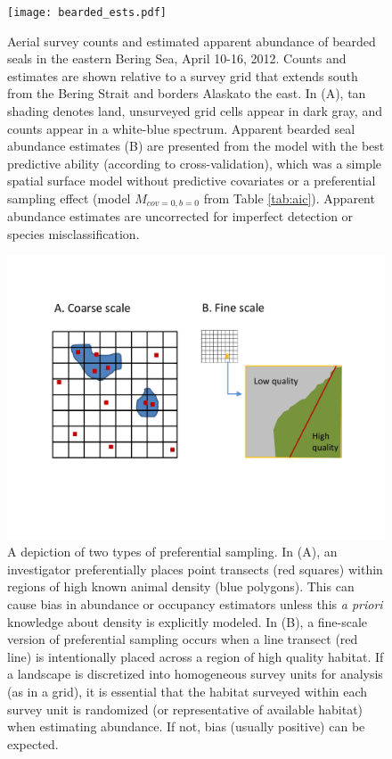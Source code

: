 \documentclass[times,mee,doublespace,]{besauth2}
\begin{document}
\begin{figure} %
\begin{center}
\texttt{[image: bearded\_ests.pdf]}
\caption{Aerial survey counts and estimated apparent abundance of bearded seals in the eastern Bering Sea, April 10-16, 2012. Counts and estimates are shown relative to a survey grid that extends south from the Bering Strait and borders Alaskato the east. In (A), tan shading denotes land, unsurveyed grid cells appear in dark gray, and counts appear in a white-blue spectrum.  Apparent bearded seal abundance estimates (B) are presented from the model with the best predictive ability (according to cross-validation), which was a simple spatial surface model without predictive covariates or a preferential sampling effect (model $M_{cov=0,b=0}$ from Table \ref{tab:aic}).  Apparent abundance estimates are uncorrected for imperfect detection or species misclassification.}
\label{fig:bearded_ests}
\end{center}
\end{figure}

\begin{figure} %
\begin{center}
\includegraphics[width=170mm]{Pref_sampling_diag.pdf}
\caption{A depiction of two types of preferential sampling.  In (A), an investigator preferentially places point transects (red squares) within regions of high known animal density (blue polygons).  This can cause bias in abundance or occupancy estimators unless this \textit{a priori} knowledge about density is explicitly modeled.  In (B), a fine-scale version of preferential sampling occurs when a line transect (red line) is intentionally placed across a region of high quality habitat.  If a landscape is discretized into homogeneous survey units for analysis (as in a grid), it is essential that the habitat surveyed within each survey unit is randomized (or representative of available habitat) when estimating abundance.  If not, bias (usually positive) can be expected.}
\label{fig:pref}
\end{center}
\end{figure}
\end{document}
